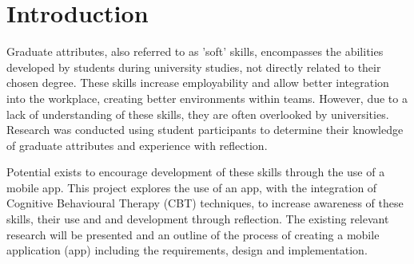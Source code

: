 \documentclass{l4proj}
\begin{document}
%
%
%
%
%
%
%
%
\chapter{Introduction}


Graduate attributes, also referred to as 'soft' skills, encompasses the abilities developed by students during university studies, not directly related to their chosen degree. These skills increase employability and allow better integration into the workplace, creating better environments within teams. However, due to a lack of understanding of these skills, they are often overlooked by universities. Research was conducted using student participants to determine their knowledge of graduate attributes and experience with reflection.

Potential exists to encourage development of these skills through the use of a mobile app. This project explores the use of an app, with the integration of Cognitive Behavioural Therapy (CBT) techniques, to increase awareness of these skills, their use and and development through reflection. The existing relevant research will be presented and an outline of the process of creating a mobile application (app) including the requirements, design and implementation.
\end{document}
